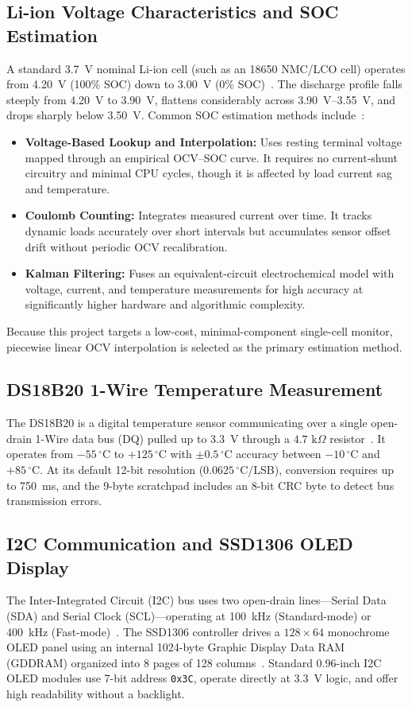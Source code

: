 \documentclass[12pt,a4paper]{article}
\begin{document}
\subsection{Li-ion Voltage Characteristics and SOC Estimation}
A standard 3.7~V nominal Li-ion cell (such as an 18650 NMC/LCO cell) operates from 4.20~V (100\% SOC) down to 3.00~V (0\% SOC)~\cite{reddy_linden}. The discharge profile falls steeply from 4.20~V to 3.90~V, flattens considerably across 3.90~V--3.55~V, and drops sharply below 3.50~V. Common SOC estimation methods include~\cite{plett_bms2}:
\begin{itemize}
    \item \textbf{Voltage-Based Lookup and Interpolation:} Uses resting terminal voltage mapped through an empirical OCV--SOC curve. It requires no current-shunt circuitry and minimal CPU cycles, though it is affected by load current sag and temperature.
    \item \textbf{Coulomb Counting:} Integrates measured current over time. It tracks dynamic loads accurately over short intervals but accumulates sensor offset drift without periodic OCV recalibration.
    \item \textbf{Kalman Filtering:} Fuses an equivalent-circuit electrochemical model with voltage, current, and temperature measurements for high accuracy at significantly higher hardware and algorithmic complexity.
\end{itemize}
Because this project targets a low-cost, minimal-component single-cell monitor, piecewise linear OCV interpolation is selected as the primary estimation method.

\subsection{DS18B20 1-Wire Temperature Measurement}
The DS18B20 is a digital temperature sensor communicating over a single open-drain 1-Wire data bus (DQ) pulled up to 3.3~V through a $4.7\text{ k}\Omega$ resistor~\cite{analog_ds18b20}. It operates from $-55\,^\circ\text{C}$ to $+125\,^\circ\text{C}$ with $\pm 0.5\,^\circ\text{C}$ accuracy between $-10\,^\circ\text{C}$ and $+85\,^\circ\text{C}$. At its default 12-bit resolution ($0.0625\,^\circ\text{C}$/LSB), conversion requires up to 750~ms, and the 9-byte scratchpad includes an 8-bit CRC byte to detect bus transmission errors.

\subsection{I2C Communication and SSD1306 OLED Display}
The Inter-Integrated Circuit (I2C) bus uses two open-drain lines—Serial Data (SDA) and Serial Clock (SCL)—operating at 100~kHz (Standard-mode) or 400~kHz (Fast-mode)~\cite{nxp_i2c}. The SSD1306 controller drives a $128 \times 64$ monochrome OLED panel using an internal 1024-byte Graphic Display Data RAM (GDDRAM) organized into 8 pages of 128 columns~\cite{solomon_ssd1306}. Standard 0.96-inch I2C OLED modules use 7-bit address \texttt{0x3C}, operate directly at 3.3~V logic, and offer high readability without a backlight.
\end{document}
